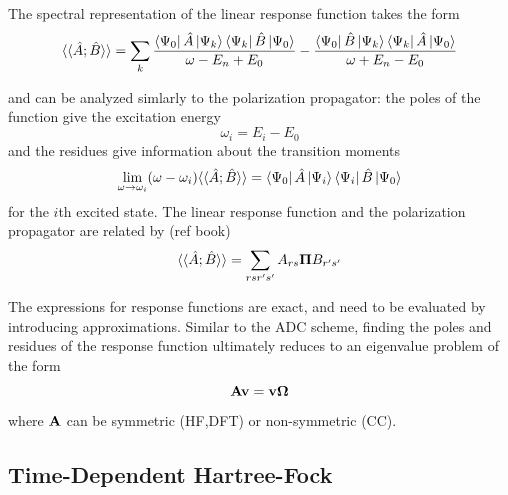 The spectral representation of the linear response function takes the form
\begin{equation}
\langle\langle \hat{A}; \hat{B}
\rangle\rangle = \sum_k \frac{
	\bra{\smash{\Psi_0}}\hat{A}\ket{\smash{\Psi_k}} \bra{\smash{\Psi_k}} \hat{B} \ket{\smash{\Psi_0}}
}{
	\omega - E_n + E_0
} - \frac{ 
	\bra{\smash{\Psi_0}}\hat{B}\ket{\smash{\Psi_k}} \bra{\smash{\Psi_k}} \hat{A} \ket{\smash{\Psi_0}}
}{
	\omega + E_n - E_0
}
\end{equation}

\noindent and can be analyzed simlarly to the polarization propagator: the poles of the function give the excitation energy
\begin{equation}
\omega_i = E_i - E_0
\end{equation}
and the residues give information about the transition moments 
\begin{equation}
\lim_{\omega \rightarrow  \omega_i} (\omega - \omega_i) \langle\langle \hat{A}; \hat{B} \rangle \rangle = \bra{\smash{\Psi_0}}\hat{A}\ket{\smash{\Psi_i}} \bra{\smash{\Psi_i}} \hat{B} \ket{\smash{\Psi_0}}
\end{equation}
for the $i$th excited state. The linear response function and the polarization propagator are related by (ref book)
\begin{equation}
\langle\langle \hat{A}; \hat{B}
\rangle\rangle = \sum_{rsr's'} A_{rs} \mathbf{\Pi} B_{r's'}
\end{equation}

The expressions for response functions are exact, and need to be evaluated by introducing approximations. Similar to the ADC scheme, finding the poles and residues of the response function ultimately reduces to an eigenvalue problem of the form
\begin{equation}
\mathbf{A}\mathbf{v} = \mathbf{v}\mathbf{\Omega}
\end{equation}
\noindent where $\mathbf{A}$ can be symmetric (HF,DFT) or non-symmetric (CC).

\subsection{Time-Dependent Hartree-Fock}

